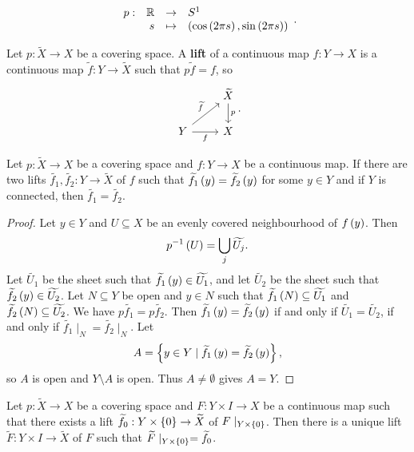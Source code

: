 \begin{example*}
$$ \function[p]{\R}{S^1}{s}{\rb{\cos\rb{2\pi s}, \sin\rb{2\pi s}}}. $$
\end{example*}

\begin{definition*}
Let $ p : \widetilde{X} \to X $ be a covering space. A \textbf{lift} of a continuous map $ f : Y \to X $ is a continuous map $ \widetilde{f} : Y \to \widetilde{X} $ such that $ p\widetilde{f} = f $, so
$$
\begin{tikzcd}
& \widetilde{X} \arrow{d}{p} \\
Y \arrow{ur}{\widetilde{f}} \arrow[swap]{r}{f} & X
\end{tikzcd}.
$$
\end{definition*}

\begin{proposition}
\label{prop:1.34}
Let $ p : \widetilde{X} \to X $ be a covering space and $ f : Y \to X $ be a continuous map. If there are two lifts $ \widetilde{f_1}, \widetilde{f_2} : Y \to \widetilde{X} $ of $ f $ such that $ \widetilde{f_1}\left( y \right) = \widetilde{f_2}\left( y \right) $ for some $ y \in Y $ and if $ Y $ is connected, then $ \widetilde{f_1} = \widetilde{f_2} $.
\end{proposition}

\begin{proof}
Let $ y \in Y $ and $ U \subseteq X $ be an evenly covered neighbourhood of $ f\left( y \right) $. Then
$$ p^{-1}\left( U \right) = \bigcup_j \widetilde{U_j}. $$
Let $ \widetilde{U_1} $ be the sheet such that $ \widetilde{f_1}\left( y \right) \in \widetilde{U_1} $, and let $ \widetilde{U_2} $ be the sheet such that $ \widetilde{f_2}\left( y \right) \in \widetilde{U_2} $. Let $ N \subseteq Y $ be open and $ y \in N $ such that $ \widetilde{f_1}\left( N \right) \subseteq \widetilde{U_1} $ and $ \widetilde{f_2}\left( N \right) \subseteq \widetilde{U_2} $. We have $ p\widetilde{f_1} = p\widetilde{f_2} $. Then $ \widetilde{f_1}\left( y \right) = \widetilde{f_2}\left( y \right) $ if and only if $ \widetilde{U_1} = \widetilde{U_2} $, if and only if $ \widetilde{f_1} \mid_N = \widetilde{f_2} \mid_N $. Let
$$ A = \left\{ y \in Y \mid \widetilde{f_1}\left( y \right) = \widetilde{f_2}\left( y \right) \right\}, $$
so $ A $ is open and $ Y \setminus A $ is open. Thus $ A \ne \emptyset $ gives $ A = Y $.
\end{proof}

\begin{proposition}
\label{prop:1.30}
Let $ p : \widetilde{X} \to X $ be a covering space and $ F : Y \times I \to X $ be a continuous map such that there exists a lift $ \widetilde{f_0} : Y \times \left\{ 0 \right\} \to \widetilde{X} $ of $ F \mid_{Y \times \left\{ 0 \right\}} $. Then there is a unique lift $ \widetilde{F} : Y \times I \to \widetilde{X} $ of $ F $ such that $ \widetilde{F} \mid_{Y \times \left\{ 0 \right\}} = \widetilde{f_0} $.
\end{proposition}


